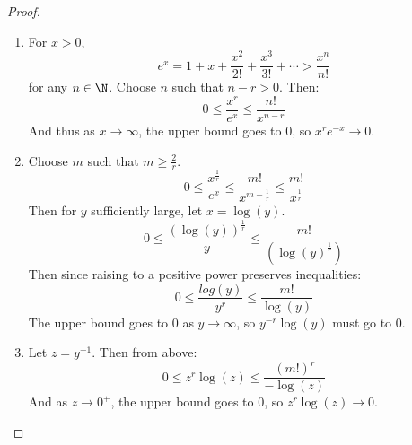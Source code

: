 \documentclass[../Main.tex]{subfiles}
\begin{document}
\begin{proof}
    \begin{enumerate}
        \item For $x > 0$,
            \begin{equation*}
                e^x = 1 + x + \frac{x^2}{2!} + \frac{x^3}{3!} + \cdots > \frac{x^n}{n!}
            \end{equation*}
            for any $n \in \N$. Choose $n$ such that $n - r > 0$. Then:
            \begin{equation*}
                0 \leq \frac{x^r}{e^x} \leq \frac{n!}{x^{n-r}}
            \end{equation*}
            And thus as $x \to \infty$, the upper bound goes to $0$, so $x^r e^{-x} \to 0$.
        \item Choose $m$ such that $m \geq \frac{2}{r}$.
            \begin{equation*}
                0 \leq \frac{x^{\frac{1}{r}}}{e^x} \leq \frac{m!}{x^{m - \frac{1}{r}}} \leq \frac{m!}{x^{\frac{1}{r}}}
            \end{equation*}
            Then for $y$ sufficiently large, let $x = \log(y)$.
            \begin{equation*}
                0 \leq \frac{(\log(y))^\frac{1}{r}}{y} \leq \frac{m!}{(\log(y)^\frac{1}{r})}
            \end{equation*}
            Then since raising to a positive power preserves inequalities:
            \begin{equation*}
                0 \leq \frac{log(y)}{y^r} \leq \frac{m!}{\log(y)}
            \end{equation*}
            The upper bound goes to $0$ as $y \to \infty$, so $y^{-r} \log(y)$ must go to $0$.
        \item Let $z = y^{-1}$. Then from above:
            \begin{equation*}
                0 \leq z^r \log(z) \leq \frac{(m!)^r}{-\log(z)}
            \end{equation*}
            And as $z \to 0^+$, the upper bound goes to $0$, so $z^r \log(z) \to 0$.
    \end{enumerate}
\end{proof}
\end{document}
